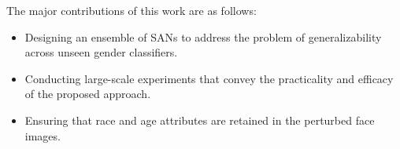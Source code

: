 \documentclass[10pt,twocolumn,letterpaper]{article}
\begin{document}
The major contributions of this work are as follows:%
\begin{itemize}[noitemsep,nolistsep]
\item Designing an ensemble of SANs to address the problem of generalizability across unseen gender classifiers.
\item Conducting large-scale experiments that convey the practicality and efficacy of the proposed approach. 
\item Ensuring that race and age attributes are retained in the perturbed face images.
\end{itemize}
\end{document}
